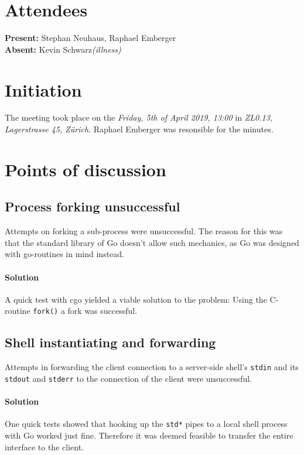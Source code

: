 \documentclass[10pt,a4paper,twoside,english,minutes]{zhawreprt}
\begin{document}
\maketitle

\section{Attendees}\label{sec:Attandees}
\textbf{Present:} Stephan Neuhaus, Raphael Emberger\\
\textbf{Absent:} Kevin Schwarz\textit{(illness)}

\section{Initiation}\label{sec:Initiation}
The meeting took place on the \textit{Friday, 5th of April 2019, 13:00} in \textit{ZL0.13, Lagerstrasse 45, Zürich}. Raphael Emberger was resonsible for the minutes.

\section{Points of discussion}
\subsection{Process forking unsuccessful}
Attempts on forking a sub-process were unsuccessful. The reason for this was that the standard
library of Go doesn’t allow such mechanics, as Go was designed with go-routines in mind instead.
\paragraph{Solution}
A quick test with cgo yielded a viable solution to the problem: Using the C-routine \texttt{fork()} a fork was successful.

\subsection{Shell instantiating and forwarding}
Attempts in forwarding the client connection to a server-side shell's \texttt{stdin} and its \texttt{stdout} and \texttt{stderr} to the connection of the client were unsuccessful.
\paragraph{Solution}
One quick tests showed that hooking up the \texttt{std*} pipes to a local shell process with Go worked just fine. Therefore it was deemed feasible to transfer the entire interface to the client.
\end{document}
